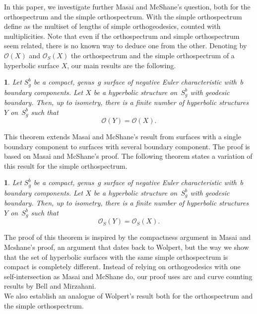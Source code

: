\documentclass[a4paper,12pt]{article}
\newtheorem*{mainTheoremAa}{\theoremnameaa}
\newcommand{\theoremnameaa}{\hypertarget{thm:Main1aIntro}{Theorem~\ref{thm:OrthoFiniteb}}}
\newtheorem*{mainTheoremAb}{\theoremnameab}
\newcommand{\theoremnameab}{\hypertarget{thm:Main1bIntro}{Theorem~\ref{thm:OrthoFiniteSimple}}}
\theoremstyle{definition}
\theoremstyle{remark}
\begin{document}
In this paper, we investigate further Masai and McShane's question, both for the orthospectrum and the simple orthospectrum. With the simple orthospectrum define as the multiset of lengths of simple orthogeodesics, counted with multiplicities. Note that even if the orthospectrum and simple orthospectrum seem related, there is no known way to deduce one from the other. Denoting by $\mathcal{O}(X)$ and $\mathcal{O}_S(X)$ the orthospectrum and the simple orthospectrum of a hyperbolic surface $X$, our main results are the following.


\begin{mainTheoremAa}\label{thm:Main1aIntro}
    Let $S_g^b$ be a compact, genus~$g$ surface of negative Euler characteristic with~$b$ boundary components. Let $X$ be a hyperbolic structure on~$S_g^b$ with geodesic boundary. Then, up to isometry, there is a finite number of hyperbolic structures $Y$ on~$S_g^b$ such that
    \[
        \mathcal{O}(Y)=\mathcal{O}(X).
    \]
\end{mainTheoremAa}

This theorem extends Masai and McShane's result from surfaces with a single boundary component to surfaces with several boundary component. The proof is based on Masai and McShane's proof. The following theorem states a variation of this result for the simple orthospectrum.

\begin{mainTheoremAb}\label{thm:Main1bIntro}
    Let $S_g^b$ be a compact, genus~$g$ surface of negative Euler characteristic with~$b$ boundary components. Let $X$ be a hyperbolic structure on~$S_g^b$ with geodesic boundary. Then, up to isometry, there is a finite number of hyperbolic structures $Y$ on~$S_g^b$ such that
    \[
        \mathcal{O}_S(Y)=\mathcal{O}_S(X).
    \]
\end{mainTheoremAb}

The proof of this theorem is inspired by the compactness argument in Masai and Mcshane's proof, an argument that dates back to Wolpert, but the way we show that the set of hyperbolic surfaces with the same simple orthospectrum is compact is completely different. Instead of relying on orthogeodesics with one self-intersection as Masai and McShane do, our proof uses arc and curve counting results by Bell and Mirzahani. \\

We also establish an analogue of Wolpert's result both for the orthospectrum and the simple orthospectrum.
\end{document}
